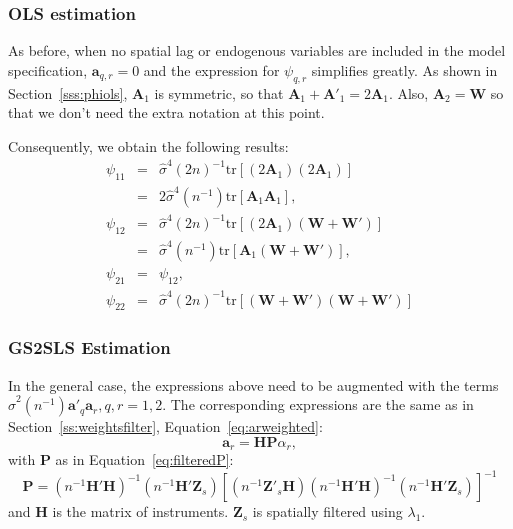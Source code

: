 \documentclass{article}
\begin{document}
\subsubsection{OLS estimation}
As before, when no spatial lag or endogenous variables are included in the
model specification, $\mathbf{a}_{q,r} = 0$ and the expression for $\psi_{q,r}$ simplifies greatly.
As shown in Section~\ref{sss:phiols},
$\mathbf{A}_1$ is symmetric, so that $\mathbf{A}_1 + \mathbf{A'}_1 = 2 \mathbf{A}_1$.
Also, $\mathbf{A}_2 = \mathbf{W}$ so that we don't need the extra notation at this
point.

Consequently, we obtain the following results:
\begin{eqnarray*}
 \psi_{11} &=& \hat{\sigma}^4 (2n)^{-1} \mbox{tr} [ (2 \mathbf{A}_1 ) (2 \mathbf{A}_1 ) ]\\
        &=&  2  \hat{\sigma}^4 (n^{-1}) \mbox{tr} [ \mathbf{A}_1\mathbf{A}_1 ],\\
  \psi_{12} &=& \hat{\sigma}^4 (2n)^{-1} \mbox{tr} [ (2 \mathbf{A}_1 ) (\mathbf{W} + \mathbf{W'} ) ]\\
       &=& \hat{\sigma}^4 (n^{-1}) \mbox{tr} [  \mathbf{A}_1 (\mathbf{W} + \mathbf{W'} )  ],\\
   \psi_{21} &=& \psi_{12},\\
   \psi_{22} &=& \hat{\sigma}^4 (2n)^{-1} \mbox{tr} [ (\mathbf{W} + \mathbf{W'}) 
   (\mathbf{W} + \mathbf{W'}) ]
\end{eqnarray*}

\subsubsection{GS2SLS Estimation}
In the general case, the expressions above need to be augmented with 
the terms $ \hat{\sigma}^2 (n^{-1}) \mathbf{a'}_q \mathbf{a}_r, q, r = 1, 2$.
The corresponding expressions are the same as in Section~\ref{ss:weightsfilter},
Equation~\ref{eq:arweighted}:
\begin{equation*}
\mathbf{a}_r = \mathbf{HP} \alpha_r,
\end{equation*}
with $\mathbf{P}$
as in Equation~\ref{eq:filteredP}:
\begin{equation*}
\mathbf{P} = (n^{-1}\mathbf{H'H})^{-1} ( n^{-1} \mathbf{H'Z}_s ) 
        [ (n^{-1} \mathbf{Z'}_s \mathbf{H} ) (n^{-1} \mathbf{H'H} )^{-1} (n^{-1} \mathbf{H'Z}_s) ]^{-1}
\end{equation*}
and $\mathbf{H}$ is the matrix of instruments. $\mathbf{Z}_s$ is spatially filtered using $\lambda_1$.
\end{document}
